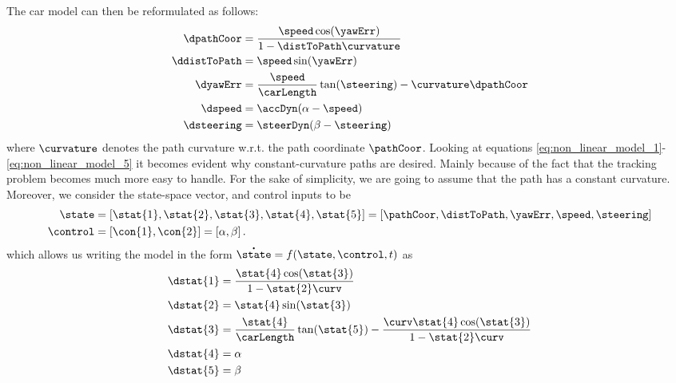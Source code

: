 	The car model can then be reformulated as follows:
	\begin{subequations}
	\begin{align}	
		\dpathCoor 	& = \frac{\speed\cos(\yawErr)}{1-\distToPath\curvature} \label{eq:non_linear_model_1}\\
		\ddistToPath& = \speed\sin(\yawErr) \label{eq:non_linear_model_2}\\
		\dyawErr    & = \frac{\speed}{\carLength}\tan(\steering) - \curvature\dpathCoor \label{eq:non_linear_model_3}\\
		\dspeed & = \accDyn(\alpha-\speed) \label{eq:non_linear_model_4}\\
		\dsteering & = \steerDyn(\beta-\steering) \label{eq:non_linear_model_5}
	\end{align}
	\end{subequations}
	where $\curvature$ denotes the path curvature w.r.t. the path coordinate $\pathCoor$.
	Looking at equations \eqref{eq:non_linear_model_1}-\eqref{eq:non_linear_model_5} it becomes evident why constant-curvature paths are desired. 
	Mainly because of the fact that the tracking problem becomes much more easy to handle.
	For the sake of simplicity, we are going to assume that the path has a constant curvature. %
	Moreover, we consider the state-space vector, and control inputs to be 
	\begin{align}
		\mathbf{\state} & = \left[ \stat{1},\stat{2},\stat{3},\stat{4},\stat{5}\right] = %
							\left[\pathCoor, \distToPath, \yawErr, \speed, \steering\right] \label{eq:stateVector}\\ 
		\mathbf{\control} & = \left[ \con{1},\con{2} \right] = %
							  \left[ \alpha, \beta \right].
	\end{align}
	which allows us writing the model in the form $ \mathbf{\dot{\state}} = f(\mathbf{\state},\mathbf{\control},t) $ as
	\begin{align}
		\dstat{1} 	& = \frac{\stat{4}\cos(\stat{3})}{1-\stat{2}\curv} \label{eq:ss1}\\
		\dstat{2}   & = \stat{4}\sin(\stat{3}) \label{eq:ss2}\\
		\dstat{3}   & = \frac{\stat{4}}{\carLength}\tan(\stat{5}) - \frac{\curv\stat{4}\cos(\stat{3})}{1-\stat{2}\curv} \label{eq:ss3}\\
		\dstat{4}   & = \alpha\label{eq:ss4}\\
		\dstat{5}   & = \beta \label{eq:ss5}		
	\end{align}
